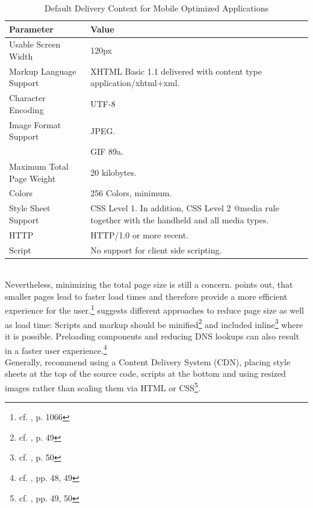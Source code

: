 \begin{table}[!tb]
    \center
    \begin{tabular}{l | p{21.5em}}
        \textbf{Parameter} & \textbf{Value} \\
        \hline
        Usable Screen Width & 120px \\
        \hline
        Markup Language Support & XHTML Basic 1.1 delivered with content type application/xhtml+xml. \\
        \hline
        Character Encoding & UTF-8 \\
        \hline
        Image Format Support & JPEG. \\
        & GIF 89a. \\
        \hline
        Maximum Total Page Weight & 20 kilobytes. \\
        \hline
        Colors & 256 Colors, minimum. \\
        \hline
        Style Sheet Support & CSS Level 1. In addition, CSS Level 2 @media rule together with the handheld and all media types. \\
        \hline
        HTTP & HTTP/1.0 or more recent. \\
        \hline
        Script & No support for client side scripting. \\
    \end{tabular}
    \caption[Mobile Default Delivery Context for Mobile Optimized Applications]{Default Delivery Context for Mobile Optimized Applications\footnotemark}
    \label{tab:DefaultDeliveryContext}
\end{table}
\\
Nevertheless, minimizing the total page size is still a concern. \cite{Wessels.2011} points out, that smaller pages lead to faster load times and therefore provide a more efficient experience for the user.\footnote{cf. \cite{Wessels.2011}, p. 1066} \cite{Nicolaou.2013} suggests different approaches to reduce page size as well as load time: Scripts and markup should be minified\footnote{cf. \cite{Nicolaou.2013}, p. 49} and included inline\footnote{cf. \cite{Nicolaou.2013}, p. 50} where it is possible. Preloading components and reducing DNS lookups can also result in a faster user experience.\footnote{cf. \cite{Nicolaou.2013}, pp. 48, 49}
\\
Generally, \cite{Nicolaou.2013} recommend using a Content Delivery System (CDN), placing style sheets at the top of the source code, scripts at the bottom and using resized images rather than scaling them via HTML or CSS\footnote{cf. \cite{Nicolaou.2013}, pp. 49, 50}.
